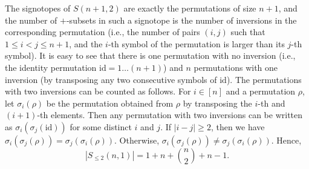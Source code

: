 \documentclass[a4paper,11pt]{amsart}
\begin{document}
The signotopes of $S(n+1,2)$ are exactly the permutations of size $n+1$, and the number of $+$-subsets in such a signotope is the number of inversions in the corresponding permutation (i.e., the number of pairs $(i,j)$ such that $1 \leq i < j \leq n+1$, and the $i$-th symbol of the permutation is larger than its $j$-th symbol).
It is easy to see that there is one permutation with no inversion (i.e., the identity permutation $\text{id} = 1\dots (n+1)$) and $n$ permutations with one inversion (by transposing any two consecutive symbols of $\text{id}$).
The permutations with two inversions can be counted as follows.
For $i \in [n]$ and a permutation $\rho$, let $\sigma_i(\rho)$ be the permutation obtained from $\rho$ by transposing the $i$-th and $(i+1)$-th elements.
Then any permutation with two inversions can be written as $\sigma_i(\sigma_j(\text{id}))$ for some distinct $i$ and $j$.
If $|i-j| \geq 2$, then we have $\sigma_i(\sigma_j(\rho)) = \sigma_j(\sigma_i(\rho))$.
Otherwise, $\sigma_i(\sigma_j(\rho)) \neq \sigma_j(\sigma_i(\rho))$.
Hence, 
\[
    |S_{\leq 2}(n,1)| = 1 + n + {n \choose 2} + n-1.
\]
\end{document}
